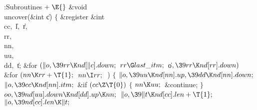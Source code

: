 \Y\B\4:Subroutines\X${}\mathrel+\E{}$\6
\1\1\&{void} \\{uncover}(\&{int} \|c)\2\2\6
${}\{{}$\1\6
\&{register} \&{int} \\{cc}${},{}$ \|l${},{}$ \|r${},{}$ \\{rr}${},{}$ %
\\{nn}${},{}$ \\{uu}${},{}$ \\{dd}${},{}$ \|t;\7
\&{for} ${}(\|o,\39\\{rr}\K\\{nd}[\|c].\\{down};{}$ ${}\\{rr}\G\\{last%
\_itm};{}$ \|o${},\39\\{rr}\K\\{nd}[\\{rr}].\\{down}){}$\1\6
\&{for} ${}(\\{nn}\K\\{rr}+\T{1};{}$ ${}\\{nn}\I\\{rr};{}$ \,)\5
${}\{{}$\1\6
${}\|o,\39\\{uu}\K\\{nd}[\\{nn}].\\{up},\39\\{dd}\K\\{nd}[\\{nn}].\\{down};{}$\6
${}\|o,\39\\{cc}\K\\{nd}[\\{nn}].\\{itm};{}$\6
\&{if} ${}(\\{cc}\Z\T{0}){}$\5
${}\{{}$\1\6
${}\\{nn}\K\\{uu};{}$\6
\&{continue};\6
\4${}\}{}$\2\6
${}\\{oo},\39\\{nd}[\\{uu}].\\{down}\K\\{nd}[\\{dd}].\\{up}\K\\{nn};{}$\6
${}\|o,\39\|t\K\\{nd}[\\{cc}].\\{len}+\T{1};{}$\6
${}\|o,\39\\{nd}[\\{cc}].\\{len}\K\|t;{}$\6
